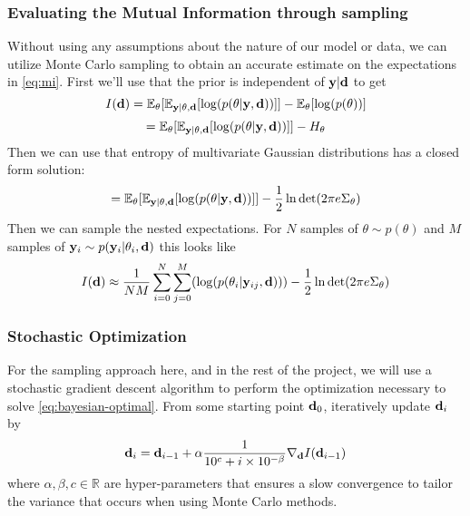 \subsubsection{Evaluating the Mutual Information through sampling}
Without using any assumptions about the nature of our model or data, we can utilize Monte Carlo sampling to obtain an accurate estimate on the expectations in \eqref{eq:mi}.
First we'll use that the prior is independent of $\mathbf{y}|\mathbf{d}$ to get
\begin{equation}
  I(\mathbf{d}) = \mathbb{E}_{\mathbf{\theta}}[\mathbb{E}_{\mathbf{y}| \theta, \mathbf{d}} [\log(p(\theta | \mathbf{y}, \mathbf{d}))]] - \mathbb{E}_{\theta}[\log(p(\theta))]
\end{equation}
\begin{equation}
  = \mathbb{E}_{\mathbf{\theta}}[\mathbb{E}_{\mathbf{y}| \theta, \mathbf{d}} [\log(p(\theta | \mathbf{y}, \mathbf{d}))]] - H_\theta
\end{equation}
Then we can use that entropy of multivariate Gaussian distributions has a closed form solution:
\begin{equation}
  = \mathbb{E}_{\mathbf{\theta}}[\mathbb{E}_{\mathbf{y}| \theta, \mathbf{d}} [\log(p(\theta | \mathbf{y}, \mathbf{d}))]] - \frac{1}{2}\ln \det (2\pi e\Sigma_\theta)
\end{equation}
Then we can sample the nested expectations. For $N$ samples of $\theta \sim p(\theta)$ and $M$ samples of $\mathbf{y}_i \sim p(\mathbf{y}_i | \theta_i, \mathbf{d})$ this looks like
\begin{equation}
  \label{eq:mi-sampled}I(\mathbf{d}) \approx \frac{1}{NM}\sum_{i=0}^N\sum_{j=0}^M(\log (p(\theta_i | \mathbf{y}_{ij}, \mathbf{d}))) - \frac{1}{2}\ln \det (2\pi e\Sigma_\theta)
\end{equation}

\subsubsection{Stochastic Optimization}
For the sampling approach here, and in the rest of the project, we will use a stochastic gradient descent algorithm to perform the optimization necessary to solve \eqref{eq:bayesian-optimal}.
From some starting point $\mathbf{d}_0$, iteratively update $\mathbf{d}_i$ by
\begin{equation}
  \mathbf{d}_i = \mathbf{d}_{i-1} + \alpha \frac{1}{10^c + i \times 10^{-\beta}} \nabla_{\mathbf{d}} I(\mathbf{d}_{i-1})
\end{equation}
where $\alpha, \beta, c \in \mathbb{R}$ are hyper-parameters that ensures a slow convergence to tailor the variance that occurs when using Monte Carlo methods.

